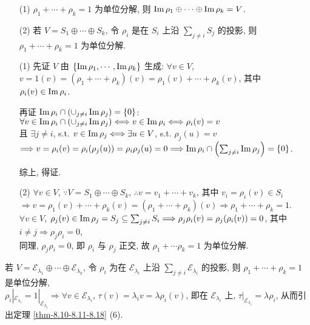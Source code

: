\documentclass{note}
\begin{document}
\begin{thm}
    \begin{itemize}
        \item[(1)] $\rho_1+\cdots+\rho_k=1$ 为单位分解, 则 $\operatorname{Im}\rho_1\oplus\cdots\oplus\operatorname{Im}\rho_k=V$.
        \item[(2)] 若 $V=S_1\oplus\cdots\oplus S_k$, 令 $\rho_i$ 是在 $S_i$ 上沿 $\sum_{j\neq i}S_j$ 的投影, 则 $\rho_1+\cdots+\rho_k=1$ 为单位分解.
    \end{itemize}
\end{thm}
\begin{pf}
    \begin{itemize}
        \item[(1)] 先证 $V$ 由 $\{\operatorname{Im}\rho_1,\cdots,\operatorname{Im}\rho_k\}$ 生成: $\forall v\in V$, $v=1(v)=(\rho_1+\cdots+\rho_k)(v)=\rho_1(v)+\cdots+\rho_k(v)$, 其中 $\rho_i(v)\in\operatorname{Im}\rho_i$.

        再证 $\operatorname{Im}\rho_i\cap\left(\cup_{j\neq i}\operatorname{Im}\rho_j\right)=\{0\}$: $\forall v\in\operatorname{Im}\rho_i\cap\left(\cup_{j\neq i}\operatorname{Im}\rho_j\right)\Longleftrightarrow v\in\operatorname{Im}\rho_i\Longleftrightarrow\rho_i(v)=v$\\
        且 $\exists j\neq i$, s.t. $v\in\operatorname{Im}\rho_j\Longleftrightarrow\exists u\in V$, s.t. $\rho_j(u)=v$\\
        $\Longrightarrow v=\rho_i(v)=\rho_i(\rho_j(u))=\rho_i\rho_j(u)=0\Longrightarrow\operatorname{Im}\rho_i\cap\left(\sum_{j\neq i}\operatorname{Im}\rho_j\right)=\{0\}$.

        综上, 得证.
        \item[(2)] $\forall v\in V$, $\because V=S_1\oplus\cdots\oplus S_k$, $\therefore v=v_1+\cdots+v_k$, 其中 $v_i=\rho_i(v)\in S_i$\\
        $\Longrightarrow v=\rho_1(v)+\cdots+\rho_k(v)=(\rho_1+\cdots+\rho_k)(v)\Longrightarrow\rho_1+\cdots+\rho_k=1$.\\
        $\forall v\in V$, $\rho_j(v)\in\operatorname{Im}\rho_j=S_j\subseteq\sum_{j\neq i}S_i\Longrightarrow\rho_j\rho_i(v)=\rho_j(\rho_i(v))=0$, 其中 $i\neq j\Longrightarrow\rho_j\rho_i=0$,\\
        同理, $\rho_j\rho_i=0$, 即 $\rho_i$ 与 $\rho_j$ 正交, 故 $\rho_1+\cdots\rho_k=1$ 为单位分解.
    \end{itemize}
\end{pf}

若 $V=\mathcal{E}_{\lambda_1}\oplus\cdots\oplus\mathcal{E}_{\lambda_k}$, 令 $\rho_i$ 为在 $\mathcal{E}_{\lambda_i}$ 上沿 $\sum_{j\neq i}\mathcal{E}_{\lambda_i}$ 的投影, 则 $\rho_1+\cdots+\rho_k=1$ 是单位分解,\\
$\rho_i|_{\mathcal{E}_{\lambda_i}}=1|_{\mathcal{E}_{\lambda_i}}\Longrightarrow\forall v\in\mathcal{E}_{\lambda_i}$, $\tau(v)=\lambda_iv=\lambda\rho_i(v)$, 即在 $\mathcal{E}_{\lambda_i}$ 上, $\tau|_{\mathcal{E}_{\lambda_i}}=\lambda\rho_i$, 从而引出定理 \ref{thm-8.10-8.11-8.18} (6).
\ifx\allfiles\undefined
\end{document}
